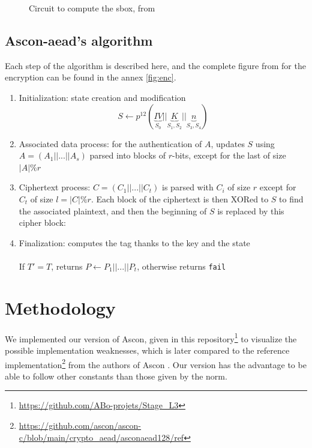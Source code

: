 \documentclass[11pt,technote]{IEEEtran}
\begin{document}
		\begin{figure}[H]
			\centering
			\resizebox*{230pt}{135pt}{
			
			}
			\caption{Circuit to compute the \ac{sbox}, from \protect \footnotemark}
			\label{circuit_sbox}
		\end{figure}
		
		
		
		\subsection{Ascon-\ac{aead}'s algorithm}
		Each step of the algorithm is described here, and the complete figure from \cite{cours_crypto} for the encryption can be found in the annex \ref{fig:enc}.
		
		\begin{enumerate}
		\item Initialization: state creation and modification
		$$S \leftarrow p^{12}( \underbrace{IV}_{S_0}||\underbrace{K}_{S_1,S_2}||\underbrace{n}_{S_3,S_4})$$
		
		\item Associated data process: for the authentication of $A$, updates $S$ using $A=(A_1||...||A_s)$ parsed into blocks of $r$-bits, except for the last of size $|A|\%r$\\
		
		\item Ciphertext process: $C = (C_1 || ... || C_t)$ is parsed with $C_i$ of size $r$ except for $C_t$ of size $l=|C| \% r$. Each block of the ciphertext is then XORed to $S$ to find the associated plaintext, and then the beginning of $S$ is replaced by this cipher block:\\
		
		\item Finalization: computes the tag thanks to the key and the state\\
		\\
		If $T'= T$, returns $P \leftarrow P_1 || ... || P_t$, otherwise returns \verb|fail|
		\end{enumerate}
		
		\section{Methodology}
		We implemented our version of Ascon, given in this repository\footnote{\url{https://github.com/ABo-projets/Stage_L3}} to visualize the possible implementation weaknesses, which is later compared to the reference implementation\footnote{\url{https://github.com/ascon/ascon-c/blob/main/crypto\_aead/asconaead128/ref}} from the authors of Ascon \cite{ascon}. Our version has the advantage to be able to follow other constants than those given by the norm.
		
\end{document}
